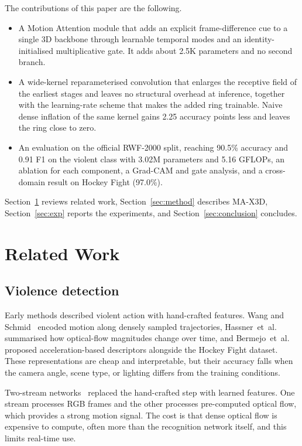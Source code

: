 \documentclass[conference]{IEEEtran}
\begin{document}
The contributions of this paper are the following.
\begin{itemize}
  \item A Motion Attention module that adds an explicit
        frame-difference cue to a single 3D backbone through learnable
        temporal modes and an identity-initialised multiplicative gate.
        It adds about 2.5K parameters and no second branch.
  \item A wide-kernel reparameterised convolution that enlarges the
        receptive field of the earliest stages and leaves no structural
        overhead at inference, together with the learning-rate scheme
        that makes the added ring trainable. Naive dense inflation of
        the same kernel gains 2.25 accuracy points less and leaves the
        ring close to zero.
  \item An evaluation on the official RWF-2000 split, reaching 90.5\%
        accuracy and 0.91 F1 on the violent class with 3.02M parameters
        and 5.16 GFLOPs, an ablation for each component, a Grad-CAM and
        gate analysis, and a cross-domain result on Hockey Fight
        (97.0\%).
\end{itemize}

Section~\ref{sec:related} reviews related work,
Section~\ref{sec:method} describes MA-X3D,
Section~\ref{sec:exp} reports the experiments, and
Section~\ref{sec:conclusion} concludes.

\section{Related Work}
\label{sec:related}

\subsection{Violence detection}

Early methods described violent action with hand-crafted features.
Wang and Schmid~\cite{idt} encoded motion along densely sampled
trajectories, Hassner~et~al.~\cite{vif} summarised how optical-flow
magnitudes change over time, and Bermejo~et~al.~\cite{hockey} proposed
acceleration-based descriptors alongside the Hockey Fight dataset.
These representations are cheap and interpretable, but their accuracy
falls when the camera angle, scene type, or lighting differs from the
training conditions.

Two-stream networks~\cite{twostream} replaced the hand-crafted step
with learned features. One stream processes RGB frames and the other
processes pre-computed optical flow, which provides a strong motion
signal. The cost is that dense optical flow is expensive to compute,
often more than the recognition network itself, and this limits
real-time use.
\end{document}
